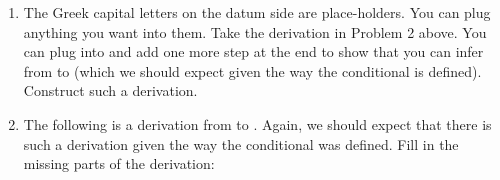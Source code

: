 \begin{enumerate}
\begin{argument*}





\end{argument*}



 \newpage
\item The Greek capital letters on the datum side are place-holders. You can 
 plug anything you want into them. Take the derivation in Problem 2 above. You 
 can plug  into \p{\Delta} and add one more step at the end to show  that 
 you can infer from  to  (which we should expect given the way the conditional is 
 defined).  Construct such a derivation.


\item The following is a derivation from  to 
 . Again, we should expect that there is such a 
 derivation given the way the conditional was defined. Fill in the missing parts 
 of the derivation:

\begin{argument*}


\end{argument*}
\end{enumerate}
